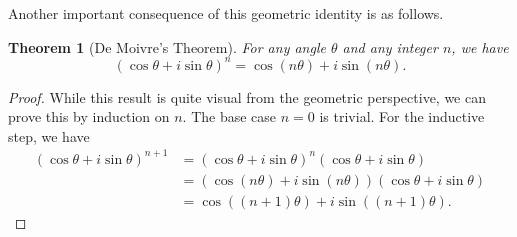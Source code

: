 \documentclass[11pt,oneside,reqno]{amsart}
\numberwithin{equation}{section}
\newtheorem{theorem}{Theorem}[section]
\theoremstyle{definition}
\theoremstyle{remark}
\begin{document}
Another important consequence of this geometric identity is as follows. 
\begin{theorem}[De Moivre's Theorem]
    For any angle $\theta$ and any integer $n$, we have
    \[(\cos\theta + i\sin\theta)^n = \cos(n\theta) + i\sin(n\theta).\]
\end{theorem}
\begin{proof}
    While this result is quite visual from the geometric perspective, we can prove this by induction on $n$. The base case $n = 0$ is trivial. For the inductive step, we have
    \begin{align*}
        (\cos\theta + i\sin\theta)^{n+1} &= (\cos\theta + i\sin\theta)^n(\cos\theta + i\sin\theta) \\
        &= (\cos(n\theta) + i\sin(n\theta))(\cos\theta + i\sin\theta) \\
        &= \cos((n+1)\theta) + i\sin((n+1)\theta).
    \end{align*}
\end{proof}
\end{document}
